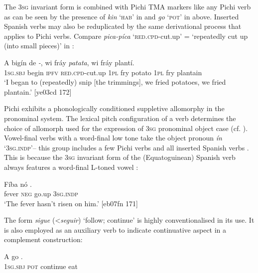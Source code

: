 The \textsc{3sg} invariant form is combined with Pichi TMA markers like any Pichi verb as can be seen by the presence of \textit{kin} ‘\textsc{hab}’ in  and \textit{go} ‘\textsc{pot}’ in  above. Inserted Spanish verbs may also be reduplicated by the same derivational process that applies to Pichi verbs. Compare \textit{pica-píca} ‘\textsc{red}.\textsc{cpd}{}-cut.up’ = ‘repeatedly cut up (into small pieces)’ in : 


\ea%
    \label{ex:key:1712}
    \gll \MakeUppercase{A}   bigín  de  \textit{{}-},    wi  fráy  \textit{patata},  wi  fráy  plantí.\\
\textsc{1sg.sbj}  begin  \textsc{ipfv}  \textsc{red.cpd-}cut.up  \textsc{1pl}  fry  potato  \textsc{1pl}  fry  plantain\\

\glt ‘I began to (repeatedly) snip [the trimmings], we fried potatoes, we fried
plantain.’ [ye03cd 172]
\z

Pichi exhibits a phonologically conditioned suppletive allomorphy in the pronominal system. The lexical pitch configuration of a verb determines the choice of allomorph used for the expression of \textsc{3sg} pronominal object case (cf. ). Vowel-final verbs with a word-final low tone take the object pronoun \textit{ín} ‘\textsc{3sg.indp}’– this group includes a few Pichi verbs and all inserted Spanish verbs . This is because the \textsc{3sg} invariant form of the (Equatoguinean) Spanish verb always features a word-final L-toned vowel :


\ea%
    \label{ex:key:1713}
    \gll Fíba    nó      .\\
fever  \textsc{neg}  go.up  \textsc{3sg.indp}\\

\glt ‘The fever hasn’t risen on him.’ [eb07fn 171]
\z

The form \textit{sigue} (<\textit{seguir}) ‘follow; continue’ is highly conventionalised in its use. It is also employed as an auxiliary verb to indicate continuative aspect in a complement construction: 


\ea%
    \label{ex:key:1714}
    \gll \MakeUppercase{A}   go      .\\
\textsc{1sg.sbj}  \textsc{pot}  continue    eat\\

